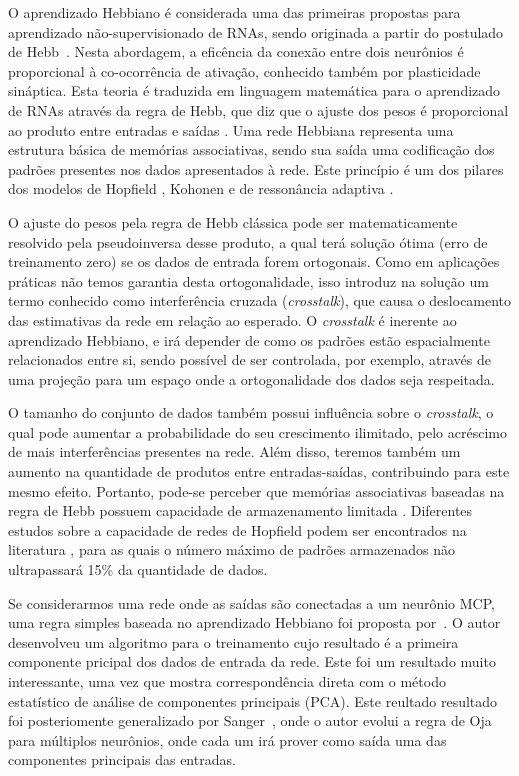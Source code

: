 \documentclass[conference]{IEEEtran}
\begin{document}
	O aprendizado Hebbiano é considerada uma das primeiras propostas para aprendizado não-supervisionado de RNAs, sendo originada a partir do postulado de Hebb~\cite{hebb1949organization}. Nesta abordagem, a eficência da conexão entre dois neurônios é proporcional à co-ocorrência de ativação, conhecido também por plasticidade sináptica. Esta teoria é traduzida em linguagem matemática para o aprendizado de RNAs através da regra de Hebb, que diz que o ajuste dos pesos é proporcional ao produto entre entradas e saídas \cite{gerstner2002mathematical}. Uma rede Hebbiana representa uma estrutura básica de memórias associativas, sendo sua saída uma codificação dos padrões presentes nos dados apresentados à rede. Este princípio é um dos pilares dos modelos de Hopfield \cite{hopfield1982neural}, Kohonen \cite{kohonen1982self} e de ressonância adaptiva \cite{carpenter1988art}.
	
	O ajuste do pesos pela regra de Hebb clássica pode ser matematicamente resolvido pela pseudoinversa desse produto, a qual terá solução ótima (erro de treinamento zero) se os dados de entrada forem ortogonais. Como em aplicações práticas não temos garantia desta ortogonalidade, isso introduz na solução um termo conhecido como interferência cruzada (\textit{crosstalk}), que causa o deslocamento das estimativas da rede em relação ao esperado. O \textit{crosstalk} é inerente ao aprendizado Hebbiano, e irá depender de como os padrões estão espacialmente relacionados entre si, sendo possível de ser controlada, por exemplo, através de uma projeção para um espaço onde a ortogonalidade dos dados seja respeitada.

	O tamanho do conjunto de dados também possui influência sobre o \textit{crosstalk}, o qual pode aumentar a probabilidade do seu crescimento ilimitado, pelo acréscimo de mais interferências presentes na rede. Além disso, teremos também um aumento na quantidade de produtos entre entradas-saídas, contribuindo para este mesmo efeito. Portanto, pode-se perceber que memórias associativas baseadas na regra de Hebb possuem capacidade de armazenamento limitada \cite{jain1996artificial}. Diferentes estudos sobre a capacidade de redes de Hopfield podem ser encontrados na literatura \cite{abu1985information, mceliece1987capacity}, para as quais o número máximo de padrões armazenados não ultrapassará 15\% da quantidade de dados. 

	Se considerarmos uma rede onde as saídas são conectadas a um neurônio MCP, uma regra simples baseada no aprendizado Hebbiano foi proposta por~\cite{oja1982simplified}. O autor desenvolveu um algoritmo para o treinamento cujo resultado é a primeira componente pricipal dos dados de entrada da rede. Este foi um resultado muito interessante, uma vez que mostra correspondência direta com o método estatístico de análise de componentes principais (PCA). Este reultado resultado foi posteriomente generalizado por Sanger~\cite{sanger1989optimal}, onde o autor evolui a regra de Oja para múltiplos neurônios, onde cada um irá prover como saída uma das componentes principais das entradas.
	
\end{document}
